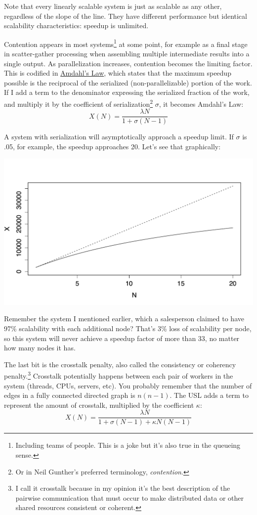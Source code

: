\documentclass{vivid_layout}
\begin{document}
Note that every linearly scalable system is just as scalable as any other,
regardless of the slope of the line. They have different performance but
identical scalability characteristics: speedup is unlimited. 

Contention appears in most systems\footnote{Including teams of people. This is a
joke but it's also true in the queueing sense.} at some point, for example as a
final stage in scatter-gather processing when assembling multiple intermediate
results into a single output. As parallelization increases, contention becomes
the limiting factor. This is codified in
\href{https://en.wikipedia.org/wiki/Amdahl\%27s\_law}{Amdahl's Law}, which
states that the maximum speedup possible is the reciprocal of the serialized
(non-parallelizable) portion of the work. If I add a term to the denominator
expressing the serialized fraction of the work, and multiply it by the
coefficient of serialization\footnote{Or in Neil Gunther's preferred
terminology, {\itshape contention}.} $\sigma$, it becomes Amdahl's Law:
\begin{equation}
X(N) = \frac{\lambda N}{1 + \sigma(N-1)}
\label{amdahl}
\end{equation}

A system with serialization will asymptotically approach a speedup limit.
If $\sigma$ is .05, for example, the speedup approaches 20. Let's see that
graphically:
\begin{center}
\includegraphics[width=.85\linewidth]{scalability/amdahl}
\end{center}

Remember the system I mentioned earlier, which a salesperson claimed to have
97\% scalability with each additional node? That's 3\% loss of scalability per
node, so this system will never achieve a speedup factor of more than 33, no
matter how many nodes it has.

The last bit is the crosstalk penalty, also called the consistency or coherency
penalty.\footnote{I call it crosstalk because in my opinion it's the best
description of the pairwise communication that must occur to make distributed
data or other shared resources consistent or coherent.} Crosstalk potentially
happens between each pair of workers in the system (threads, CPUs, servers,
etc).  You probably remember that the number of edges in a fully connected
directed graph is $n(n-1)$.  The USL adds a term to represent the amount
of crosstalk, multiplied by the coefficient $\kappa$:
\begin{equation}
X(N) = \frac{\lambda N}{1 + \sigma(N-1) + \kappa N(N-1)}
\label{usl}
\end{equation}
\end{document}
